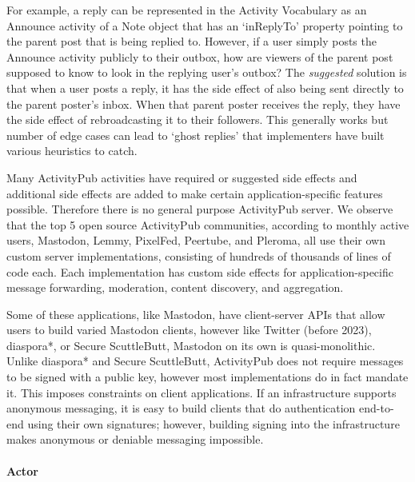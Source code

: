 For example, a reply can be represented in the Activity Vocabulary as an Announce activity of a Note object that has an `inReplyTo' property pointing to the parent post that is being replied to.
However, if a user simply posts the Announce activity publicly to their outbox, how are viewers of the parent post supposed to know to look in the replying user's outbox?
The \emph{suggested} solution is that when a user posts a reply, it has the side effect of also being sent directly to the parent poster's inbox. When that parent poster receives the reply, they have the side effect of rebroadcasting it to their followers.
This generally works but number of edge cases can lead to `ghost replies' that implementers have built various heuristics to catch.

Many ActivityPub activities have required or suggested side effects and additional side effects are added to make certain application-specific features possible.
Therefore there is no general purpose ActivityPub server.
We observe that the top 5 open source ActivityPub communities, according to monthly active users, Mastodon, Lemmy, PixelFed, Peertube, and Pleroma, all use their own custom server implementations, consisting of hundreds of thousands of lines of code each. Each implementation has custom side effects for application-specific message forwarding, moderation, content discovery, and aggregation.

Some of these applications, like Mastodon, have client-server APIs that allow users to build varied Mastodon clients, however like Twitter (before 2023), diaspora*, or Secure ScuttleButt, Mastodon on its own is quasi-monolithic.
Unlike diaspora* and Secure ScuttleButt, ActivityPub does not require messages to be signed with a public key, however most implementations do in fact mandate it.  This imposes constraints on client applications.   If an infrastructure supports anonymous messaging, it is easy to build clients that do authentication end-to-end using their own signatures; however, building signing into the infrastructure makes anonymous or deniable messaging impossible.

\paragraph{Actor}

